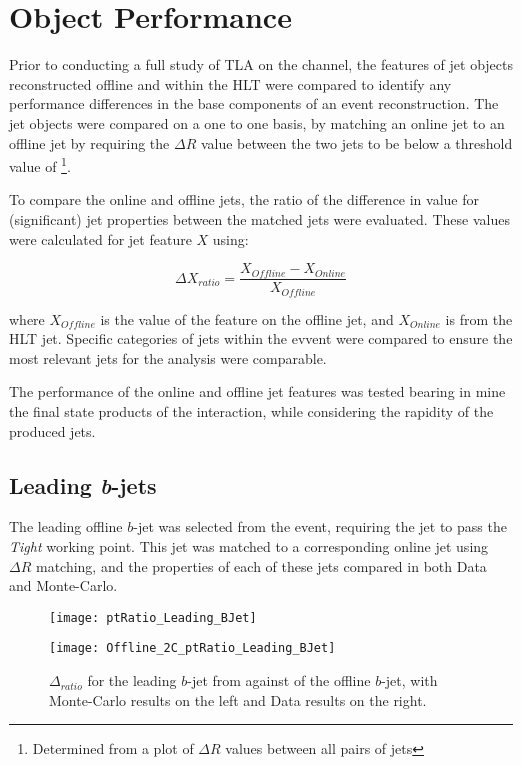 \chapter{Object Performance}\label{c:OP}

Prior to conducting a full study of TLA on the \VBFHBB channel, the features of jet objects reconstructed offline and within the HLT were compared to identify any performance differences in the base components of an event reconstruction. The jet objects were compared on a one to one basis, by matching an online jet to an offline jet by requiring the $\Delta R$ value between the two jets to be below a threshold value of \DELTARTHRESHOLD\footnote{Determined from a plot of $\Delta R$ values between all pairs of jets}. 

To compare the online and offline jets, the ratio of the difference in value for (significant) jet properties between the matched jets were evaluated. These values were calculated for jet feature $X$ using:

	\begin{equation}
	\Delta X_{ratio} = \frac{X_{Offline} - X_{Online}}{X_{Offline}}
	\end{equation}
	
	where $X_{Offline}$ is the value of the feature on the offline jet, and $X_{Online}$ is from the HLT jet. Specific categories of jets within the evvent were compared to ensure the most relevant jets for the \VBFH analysis were comparable.
	
	The performance of the online and offline jet features was tested bearing in mine the final state products of the \VBFHBB interaction, while considering the rapidity of the produced jets. 

\section{Leading \textit{b}-jets}
\label{OP:leadingb}

	The leading \pt offline $b$-jet was selected from the event, requiring the jet to pass the \textit{Tight} \btagging working point. This jet was matched to a corresponding online jet using $\Delta R$ matching, and the properties of each of these jets compared in both Data and Monte-Carlo.

		\begin{figure}[h]
			\centering
			\begin{minipage}[h]{0.33\linewidth}
				\texttt{[image: ptRatio\_Leading\_BJet]}

			\end{minipage}
			\quad
			\begin{minipage}[h]{0.33\linewidth}
				\texttt{[image: Offline\_2C\_ptRatio\_Leading\_BJet]}
			\end{minipage}
			\caption{$\Delta $\pt$_{ratio}$ for the leading \pt $b$-jet from against \pt of the offline $b$-jet, with Monte-Carlo results on the left and Data results on the right.}
			\label{fig:O:leadingbpt}
		\end{figure}
		
